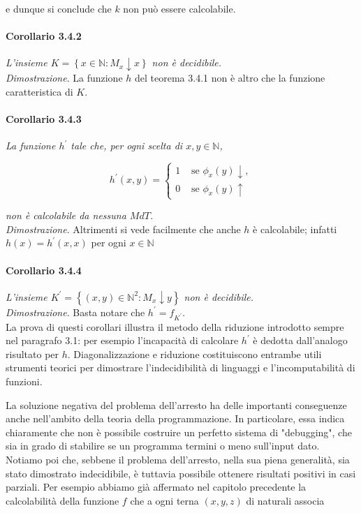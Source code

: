 e dunque si conclude che $k$ non può essere calcolabile.

\paragraph{Corollario 3.4.2}
\textit{L'insieme $K=\left\{x \in \mathbb{N}: M_x \downarrow x\right\}$ non è
    decidibile.}\\

\textit{Dimostrazione}. La funzione $h$ del teorema 3.4.1 non è altro che la
funzione caratteristica di $K$.

\paragraph{Corollario 3.4.3} \textit{La funzione $h^{\prime}$ tale
    che, per ogni scelta di $x, y \in \mathbb{N}$,}

\[
    h^{\prime}(x, y)= \begin{cases}1 & \text { se } \phi_x(y) \downarrow, \\ 0 & \text { se } \phi_x(y) \uparrow\end{cases}
\]

\textit{non è calcolabile da nessuna $M d T$.}\\

\textit{Dimostrazione}. Altrimenti si vede
facilmente che anche $h$ è calcolabile; infatti $h(x)=h^{\prime}(x, x)$ per ogni
$x \in \mathbb{N}$

\paragraph*{Corollario 3.4.4} \textit{L'insieme $K^{\prime}=\left\{(x, y) \in
        \mathbb{N}^2: M_x \downarrow y\right\}$ non è decidibile.}\\

\textit{Dimostrazione}. Basta
notare che $h^{\prime}=f_{K^{\prime}}$.\\

La prova di questi corollari illustra il
metodo della riduzione introdotto sempre nel paragrafo 3.1: per esempio
l'incapacità di calcolare $h^{\prime}$ è dedotta dall'analogo risultato per $h$.
Diagonalizzazione e riduzione costituiscono entrambe utili strumenti teorici per
dimostrare l'indecidibilità di linguaggi e l'incomputabilità di funzioni.

La soluzione negativa del problema dell'arresto ha delle importanti conseguenze
anche nell'ambito della teoria della programmazione. In particolare, essa indica
chiaramente che non è possibile costruire un perfetto sistema di "debugging",
che sia in grado di stabilire se un programma termini o meno sull'input dato.
Notiamo poi che, sebbene il problema dell'arresto, nella sua piena generalità,
sia stato dimostrato indecidibile, è tuttavia possibile ottenere risultati
positivi in casi parziali. Per esempio abbiamo già affermato nel capitolo
precedente la calcolabilità della funzione $f$ che a ogni terna $(x, y, z)$ di
naturali associa

